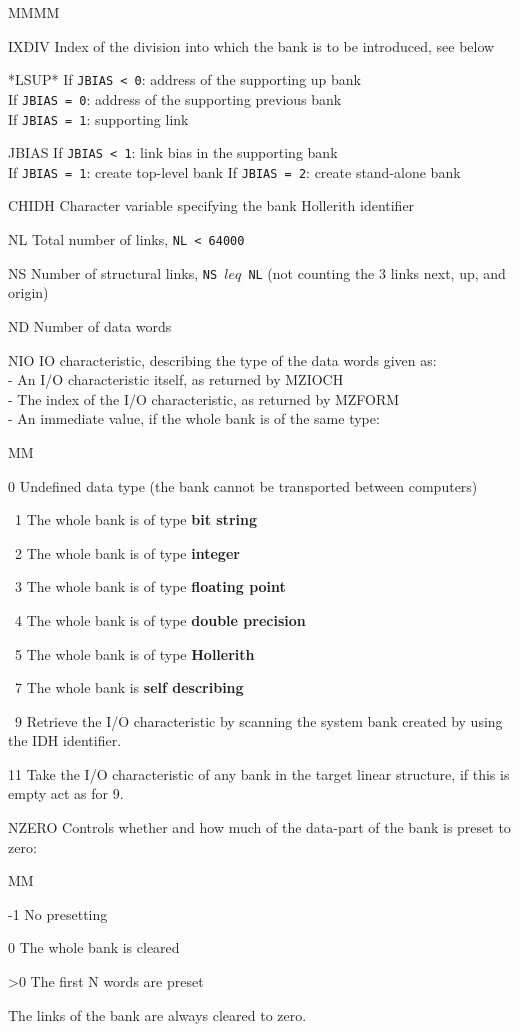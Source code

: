 \begin{DL}{MMMM}
\item[IXDIV]Index of the division into which the bank is
to be introduced, see below
\item[*LSUP*]If {\tt JBIAS < 0}:  address of the supporting up bank\\
If {\tt JBIAS = 0}:  address of the supporting previous bank\\
If {\tt JBIAS = 1}:  supporting link
\item[JBIAS]If {\tt JBIAS < 1}:  link bias in the supporting bank\\
If {\tt JBIAS = 1}:  create top-level bank
If {\tt JBIAS = 2}:  create stand-alone bank
\item[CHIDH]Character variable specifying the bank Hollerith identifier
\item[NL]Total number of links, {\tt NL < 64000}
\item[NS]Number of structural links, {\tt NS $leq$ NL}
(not counting the 3 links next, up, and origin)
\item[ND]Number of data words
\item[NIO]IO characteristic,
describing the type of the data words given as:\\
- An I/O characteristic itself, as returned by MZIOCH\\
- The index of the I/O characteristic, as returned by MZFORM\\
- An immediate value, if the whole bank is of the same type:
\begin{DL}{MM}
\item[ 0]Undefined data type (the bank cannot be transported between
computers)
\item[\ 1]The whole bank is of type {\bf bit string}
\item[\ 2]The whole bank is of type {\bf integer}
\item[\ 3]The whole bank is of type {\bf floating point}
\item[\ 4]The whole bank is of type {\bf double precision}
\item[\ 5]The whole bank is of type {\bf Hollerith}
\item[\ 7]The whole bank is {\bf self describing}
\item[\ 9]Retrieve the I/O characteristic by scanning the system
bank created by  using the IDH identifier.
\item[11]Take the I/O characteristic of any bank in the target
linear structure, if this is empty act as for 9.
\end{DL}
\item[NZERO]Controls whether and how much of the data-part
of the bank is preset to zero:
\begin{DL}{MM}
\item[-1]No presetting
\item[ 0]The whole bank is cleared
\item[>0]The first N words are preset
\end{DL}
The links of the bank are always cleared to zero.
\end{DL}

